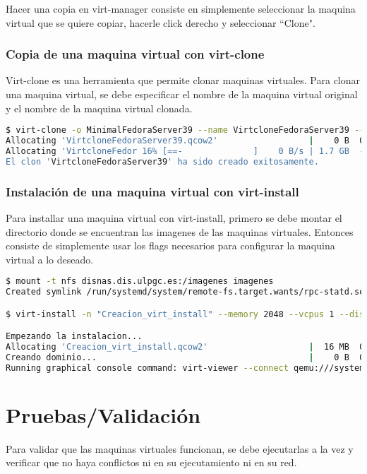 \documentclass[spanish]{article}
\begin{document}
Hacer una copia en virt-manager consiste en simplemente
seleccionar la maquina virtual que se quiere copiar,
hacerle click derecho y seleccionar ``Clone".

\subsubsection{Copia de una maquina virtual con virt-clone}

Virt-clone es una herramienta que permite clonar maquinas virtuales.
Para clonar una maquina virtual, se debe especificar el nombre de la maquina virtual
original y el nombre de la maquina virtual clonada.

\begin{lstlisting}[language=bash,breaklines=true]
$ virt-clone -o MinimalFedoraServer39 --name VirtcloneFedoraServer39 --auto-clone
Allocating 'VirtcloneFedoraServer39.qcow2'                  |    0 B  00:00 ... 
Allocating 'VirtcloneFedor 16% [==-              ]    0 B/s | 1.7 GB  --:-- ETA 
El clon 'VirtcloneFedoraServer39' ha sido creado exitosamente.
\end{lstlisting}

\subsubsection{Instalación de una maquina virtual con virt-install}

Para installar una maquina virtual con virt-install, primero se debe montar el directorio donde se encuentran las imagenes de las maquinas virtuales.
Entonces consiste de simplemente usar los flags necesarios para configurar la maquina virtual
a lo deseado.

\begin{lstlisting}[language=bash,breaklines=true]
$ mount -t nfs disnas.dis.ulpgc.es:/imagenes imagenes
Created symlink /run/systemd/system/remote-fs.target.wants/rpc-statd.service -> /usr/lib/systemd/system/rpc-statd.service.

$ virt-install -n "Creacion_virt_install" --memory 2048 --vcpus 1 --disk size=10 -c imagenes/fedora/39/isos/x86_64/Fedora-Server-netinst-x86_64-39-1.5.iso -w network=default

Empezando la instalacion...
Allocating 'Creacion_virt_install.qcow2'                    |  16 MB  00:00 ... 
Creando dominio...                                          |    0 B  00:00     
Running graphical console command: virt-viewer --connect qemu:///system --wait Creacion_virt_install
\end{lstlisting}

\section{Pruebas/Validación}

Para validar que las maquinas virtuales funcionan, se debe
ejecutarlas a la vez y verificar que no haya conflictos
ni en su ejecutamiento ni en su red.
\end{document}
